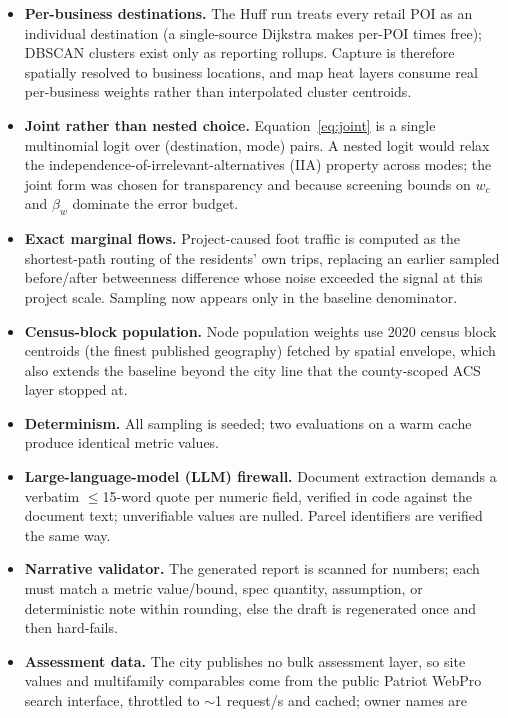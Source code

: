 \documentclass[11pt]{article}
\begin{document}
\begin{itemize}
\item \textbf{Per-business destinations.} The Huff run treats every retail POI
      as an individual destination (a single-source Dijkstra makes per-POI times
      free); DBSCAN clusters exist only as reporting rollups. Capture is therefore
      spatially resolved to business locations, and map heat layers consume real
      per-business weights rather than interpolated cluster centroids.
\item \textbf{Joint rather than nested choice.} Equation~\eqref{eq:joint} is a
      single multinomial logit over (destination, mode) pairs. A nested logit would
      relax the independence-of-irrelevant-alternatives (IIA) property across modes; the
      joint form was chosen for transparency and because screening bounds on $w_c$
      and $\beta_w$ dominate the error budget.
\item \textbf{Exact marginal flows.} Project-caused foot traffic is computed as
      the shortest-path routing of the residents' own trips, replacing an earlier
      sampled before/after betweenness difference whose noise exceeded the signal at
      this project scale. Sampling now appears only in the baseline denominator.
\item \textbf{Census-block population.} Node population weights use 2020 census
      block centroids (the finest published geography) fetched by spatial envelope,
      which also extends the baseline beyond the city line that the county-scoped
      ACS layer stopped at.
\item \textbf{Determinism.} All sampling is seeded; two evaluations on a warm
      cache produce identical metric values.
\item \textbf{Large-language-model (LLM) firewall.} Document extraction demands a verbatim
      $\leq$15-word quote per numeric field, verified in code against the document
      text; unverifiable values are nulled. Parcel identifiers are verified the
      same way.
\item \textbf{Narrative validator.} The generated report is scanned for
      numbers; each must match a metric value/bound, spec quantity, assumption, or
      deterministic note within rounding, else the draft is regenerated once and
      then hard-fails.
\item \textbf{Assessment data.} The city publishes no bulk assessment layer, so
      site values and multifamily comparables come from the public Patriot WebPro
      search interface, throttled to $\sim$1 request/s and cached; owner names are

\end{itemize}
\end{document}
